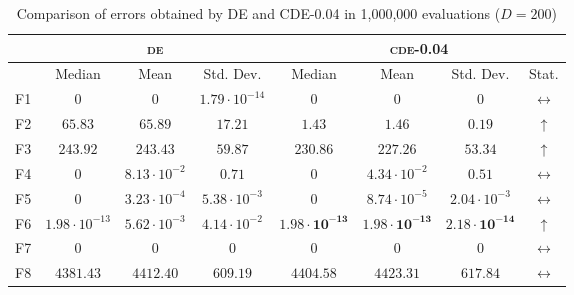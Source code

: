 \begin{table}[!t]
\caption{Comparison of errors obtained by \textsc{DE} and \textsc{CDE}-0.04 in 1,000,000 evaluations ($D = 200$)}
\label{tab:scalability_200}
\centering
\begin{scriptsize}
\begin{tabular}{c || c c c | c c c c}
\hline
 & \multicolumn{3}{|c|}{\textsc{de}} & \multicolumn{4}{|c}{\textsc{cde-0.04}} \\ \hline
    & Median                 & Mean                  & Std. Dev.             & Median                         & Mean                           & Std. Dev.                      & Stat.               \\ \hline
F1  & $0$                    & $0$                   & $1.79 \cdot 10^{-14}$ & $0$                            & $0$                            & $0$                            & $\leftrightarrow$   \\ \hline
F2  & $65.83$                & $65.89$               & $17.21$               & $\mathbf{1.43}$                & $\mathbf{1.46}$                & $\mathbf{0.19}$                & $\uparrow$          \\ \hline
F3  & $243.92$               & $243.43$              & $59.87$               & $\mathbf{230.86}$              & $\mathbf{227.26}$              & $\mathbf{53.34}$               & $\uparrow$          \\ \hline
F4  & $0$                    & $8.13 \cdot 10^{-2}$  & $0.71$                & ${0}$                          & ${4.34 \cdot 10^{-2}}$         & ${0.51}$                       & $\leftrightarrow$   \\ \hline
F5  & $0$                    & $3.23 \cdot 10^{-4}$  & $5.38 \cdot 10^{-3}$  & ${0}$                          & ${8.74 \cdot 10^{-5}}$         & ${2.04 \cdot 10^{-3}}$         & $\leftrightarrow$   \\ \hline
F6  & $1.98 \cdot 10^{-13}$  & $5.62 \cdot 10^{-3}$  & $4.14 \cdot 10^{-2}$  & $\mathbf{1.98 \cdot 10^{-13}}$ & $\mathbf{1.98 \cdot 10^{-13}}$ & $\mathbf{2.18 \cdot 10^{-14}}$          & $\uparrow$   \\ \hline
F7  & $0$                    & $0$                   & $0$                   & $0$                            & $0$                            & $0$                            & $\leftrightarrow$   \\ \hline
F8  & $4381.43$              & $4412.40$             & $609.19$              & $4404.58$                      & $4423.31$                      & $617.84$                       & $\leftrightarrow$   \\ \hline

\end{tabular}
\end{scriptsize}
\end{table}
